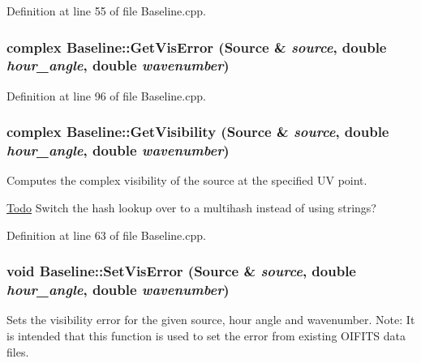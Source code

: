 Definition at line 55 of file Baseline.cpp.

\hypertarget{classBaseline_ab21c506fd87b21f6562f09a1ba7ae77a}{
\subsubsection[{GetVisError}]{\setlength{\rightskip}{0pt plus 5cm}complex Baseline::GetVisError ({\bf Source} \& {\em source}, \/  double {\em hour\_\-angle}, \/  double {\em wavenumber})}}
\label{classBaseline_ab21c506fd87b21f6562f09a1ba7ae77a}


Definition at line 96 of file Baseline.cpp.

\hypertarget{classBaseline_a817d0c4e83714b68efcc7fb7fdac9a02}{
\subsubsection[{GetVisibility}]{\setlength{\rightskip}{0pt plus 5cm}complex Baseline::GetVisibility ({\bf Source} \& {\em source}, \/  double {\em hour\_\-angle}, \/  double {\em wavenumber})}}
\label{classBaseline_a817d0c4e83714b68efcc7fb7fdac9a02}
Computes the complex visibility of the source at the specified UV point. \begin{Desc}
\item[\hyperlink{todo__todo000005}{Todo}]Switch the hash lookup over to a multihash instead of using strings? \end{Desc}


Definition at line 63 of file Baseline.cpp.

\hypertarget{classBaseline_a39f6121fa15d29d59e8b25e8850d2b0b}{
\subsubsection[{SetVisError}]{\setlength{\rightskip}{0pt plus 5cm}void Baseline::SetVisError ({\bf Source} \& {\em source}, \/  double {\em hour\_\-angle}, \/  double {\em wavenumber})}}
\label{classBaseline_a39f6121fa15d29d59e8b25e8850d2b0b}
Sets the visibility error for the given source, hour angle and wavenumber. Note: It is intended that this function is used to set the error from existing OIFITS data files. 

